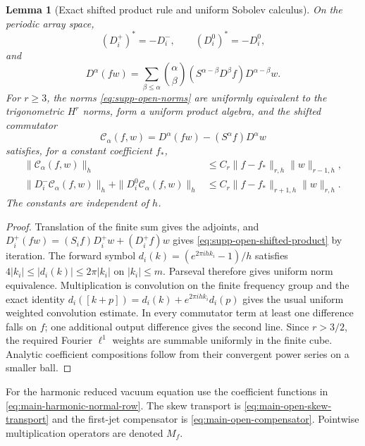\documentclass[11pt]{article}
\newtheorem{lemma}[lemma]{Lemma}
\theoremstyle{definition}
\theoremstyle{remark}
\begin{document}
\begin{lemma}[Exact shifted product rule and uniform Sobolev calculus]
\label{lem:supp-open-calculus}
On the periodic array space,
\begin{equation}
 (D_i^+)^*=-D_i^-,\qquad (D_i^0)^*=-D_i^0,
 \label{eq:supp-open-adjoints}
\end{equation}
and
\begin{equation}
 \boxed{D^\alpha(fw)=\sum_{\beta\le\alpha}\binom\alpha\beta
 (S^{\alpha-\beta}D^\beta f)D^{\alpha-\beta}w.}
 \label{eq:supp-open-shifted-product}
\end{equation}
For $r\ge3$, the norms \eqref{eq:supp-open-norms} are uniformly equivalent
to the trigonometric $H^r$ norms, form a uniform product algebra, and the
shifted commutator
\begin{equation}
 \mathcal C_\alpha(f,w)=D^\alpha(fw)-(S^\alpha f)D^\alpha w
 \label{eq:supp-open-commutator}
\end{equation}
satisfies, for a constant coefficient $f_*$,
\begin{align}
 \|\mathcal C_\alpha(f,w)\|_h
 &\le C_r\|f-f_*\|_{r,h}\|w\|_{r-1,h},\\
 \|D_i^-\mathcal C_\alpha(f,w)\|_h
 +\|D_i^0\mathcal C_\alpha(f,w)\|_h
 &\le C_r\|f-f_*\|_{r+1,h}\|w\|_{r,h}.
 \label{eq:supp-open-commutator-bounds}
\end{align}
The constants are independent of $h$.
\end{lemma}
\begin{proof}
Translation of the finite sum gives the adjoints, and
$D_i^+(fw)=(S_if)D_i^+w+(D_i^+f)w$ gives
\eqref{eq:supp-open-shifted-product} by iteration.  The forward symbol
$d_i(k)=(e^{2\pi ihk_i}-1)/h$ satisfies
$4|k_i|\le|d_i(k)|\le2\pi|k_i|$ on $|k_i|\le m$.  Parseval therefore gives
uniform norm equivalence.  Multiplication is convolution on the finite
frequency group and the exact identity
$d_i([k+p])=d_i(k)+e^{2\pi ihk_i}d_i(p)$ gives the usual uniform weighted
convolution estimate.  In every commutator term at least one difference falls
on $f$; one additional output difference gives the second line.  Since
$r>3/2$, the required Fourier $\ell^1$ weights are summable uniformly in the
finite cube.  Analytic coefficient compositions follow from their convergent
power series on a smaller ball.
\end{proof}

For the harmonic reduced vacuum equation use the coefficient functions in
\eqref{eq:main-harmonic-normal-row}.  The skew transport is
\eqref{eq:main-open-skew-transport} and the first-jet compensator is
\eqref{eq:main-open-compensator}.  Pointwise multiplication operators are
denoted $M_f$.
\end{document}
